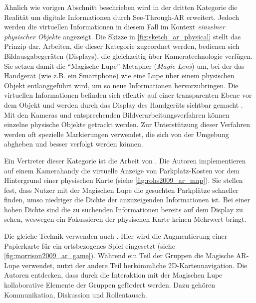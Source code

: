 Ähnlich wie vorigen Abschnitt beschrieben wird in der dritten Kategorie die Realität um digitale Informationen durch See-Through-AR erweitert.
Jedoch werden die virtuellen Informationen in diesem Fall im Kontext \emph{einzelner physischer Objekte} angezeigt.
Die Skizze in \autoref{fig:sketch_ar_physical} stellt das Prinzip dar.
Arbeiten, die dieser Kategorie zugeordnet werden, bedienen sich Bildausgabegeräten (Displays), die gleichzeitig über Kameratechnologie verfügen.
Sie setzen damit die \enquote{Magische Lupe}-Metapher (\emph{Magic Lens}) um, bei der das Handgerät (wie z.B. ein Smartphone) wie eine Lupe über einem physischen Objekt entlanggeführt wird, um so neue Informationen hervorzubringen.
Die virtuellen Informationen befinden sich effektiv auf einer transparenten Ebene vor dem Objekt und werden durch das Display des Handgeräts sichtbar gemacht \parencite{Bier1994}.
Mit den Kameras und entsprechenden Bildverarbeitungsverfahren können einzelne physische Objekte getrackt werden.
Zur Unterstützung dieser Verfahren werden oft spezielle Markierungen verwendet, die sich von der Umgebung abgheben und besser verfolgt werden können.

Ein Vertreter dieser Kategorie ist die Arbeit von \textcite{Rohs2009}.
Die Autoren implementieren auf einem Kamerahandy die virtuelle Anzeige von Parkplatz-Kosten vor dem Hintergrund einer physischen Karte (siehe \autoref{fig:rohs2009_ar_map}).
Sie stellen fest, dass Nutzer mit der Magischen Lupe die gesuchten Parkplätze schneller finden, umso niedriger die Dichte der anzuzeigenden Informationen ist.
Bei einer hohen Dichte sind die zu suchenden Informationen bereits auf dem Display zu sehen, weswegen ein Fokussieren der physischen Karte keinen Mehrwert bringt.

Die gleiche Technik verwenden auch \textcite{Morrison2009}.
Hier wird die Augmentierung einer Papierkarte für ein ortsbezogenes Spiel eingesetzt (siehe \autoref{fig:morrison2009_ar_game}).
Während ein Teil der Gruppen die Magische AR-Lupe verwendet, nutzt der andere Teil herkömmliche 2D-Kartennavigation.
Die Autoren entdecken, dass durch die Interaktion mit der Magischen Lupe kollaborative Elemente der Gruppen gefördert werden.
Dazu gehören Kommunikation, Diskussion und Rollentausch.

